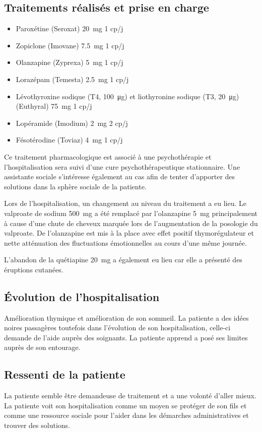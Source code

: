 \subsection{Traitements réalisés et prise en charge} 
\begin{itemize}[compact, label=\textbullet]
    \item Paroxétine (Seroxat)  \qty{20}{\mg} 1 cp/j
    \item Zopiclone (Imovane) \qty{7.5}{\mg} 1 cp/j
    \item Olanzapine (Zyprexa) \qty{5}{\mg} 1 cp/j 
    \item Lorazépam (Temesta) \qty{2.5}{\mg} 1 cp/j
    \item Lévothyroxine sodique (T4, \qty{100}{\ug}) et liothyronine sodique (T3, \qty{20}{\ug}) (Euthyral) \qty{75}{\mg} 1 cp/j 
    \item Lopéramide (Imodium) \qty{2}{\mg} 2 cp/j
    \item Fésotérodine (Toviaz) \qty{4}{\mg} 1 cp/j 
\end{itemize}
 
Ce traitement pharmacologique est associé à une psychothérapie et l’hospitalisation sera suivi d’une cure psychothérapeutique stationnaire. 
Une assistante sociale s’intéresse également au cas afin de tenter d’apporter des solutions dans la sphère sociale de la patiente. 
 
Lors de l’hospitalisation, un changement au niveau du traitement a eu lieu. Le valproate de sodium \qty{500}{\mg} a été remplacé par l’olanzapine \qty{5}{\mg} principalement à cause d’une chute de cheveux marquée lors de l’augmentation de la posologie du valproate. De l’olanzapine est mis à la place avec effet positif thymorégulateur et nette atténuation des fluctuations émotionnelles au cours d’une même journée. 
 
L’abandon de la quétiapine \qty{20}{\mg} a également eu lieu car elle a présenté des éruptions cutanées. 

\subsection{Évolution de l’hospitalisation }
Amélioration thymique et amélioration de son sommeil. 
La patiente a des idées noires passagères toutefois dans l’évolution de son hospitalisation, celle-ci demande de l’aide auprès des soignants. 
La patiente apprend a posé ses limites auprès de son entourage. 

\subsection{Ressenti de la patiente}
La patiente semble être demandeuse de traitement et a une volonté d’aller mieux. La patiente voit son hospitalisation comme un moyen se protéger de son fils et comme une ressource sociale pour l’aider dans les démarches administratives et trouver des solutions.
 
